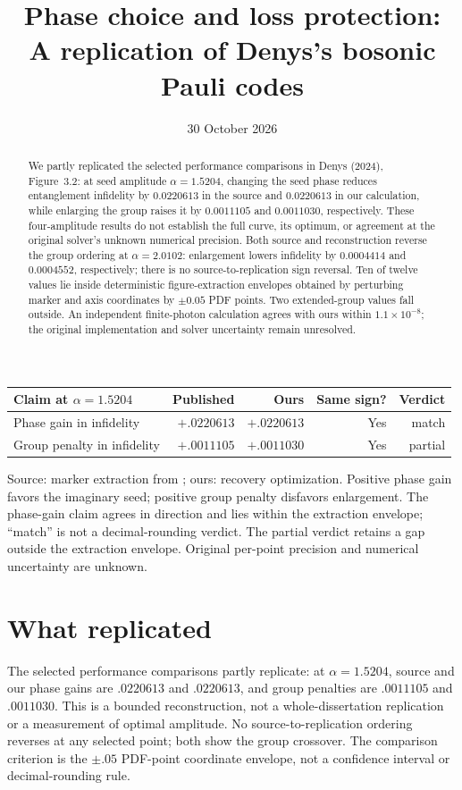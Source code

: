 \documentclass[11pt]{article}
\title{Phase choice and loss protection:\\A replication of Denys's bosonic Pauli codes}
\date{30 October 2026}
\begin{document}
\maketitle
\begin{abstract}
We partly replicated the selected performance comparisons in Denys (2024), Figure~3.2: at seed amplitude $\alpha=1.5204$, changing the seed phase reduces entanglement infidelity by $0.0220613$ in the source and $0.0220613$ in our calculation, while enlarging the group raises it by $0.0011105$ and $0.0011030$, respectively. These four-amplitude results do not establish the full curve, its optimum, or agreement at the original solver's unknown numerical precision. Both source and reconstruction reverse the group ordering at $\alpha=2.0102$: enlargement lowers infidelity by $0.0004414$ and $0.0004552$, respectively; there is no source-to-replication sign reversal. Ten of twelve values lie inside deterministic figure-extraction envelopes obtained by perturbing marker and axis coordinates by $\pm0.05$ PDF points. Two extended-group values fall outside. An independent finite-photon calculation agrees with ours within $1.1\times10^{-8}$; the original implementation and solver uncertainty remain unresolved.
\end{abstract}
\begin{center}\small
\begin{tabular}{p{.27\linewidth}rrrr}
\toprule Claim at $\alpha=1.5204$ & Published & Ours & Same sign? & Verdict\\\midrule
Phase gain in infidelity & $+.0220613$ & $+.0220613$ & Yes & match\\
Group penalty in infidelity & $+.0011105$ & $+.0011030$ & Yes & partial\\
\bottomrule\end{tabular}\end{center}
{\small Source: marker extraction from \citet[p.~150, Fig.~3.2]{denys}; ours: recovery optimization. Positive phase gain favors the imaginary seed; positive group penalty disfavors enlargement. The phase-gain claim agrees in direction and lies within the extraction envelope; ``match'' is not a decimal-rounding verdict. The partial verdict retains a gap outside the extraction envelope. Original per-point precision and numerical uncertainty are unknown.}

\section{What replicated}
The selected performance comparisons partly replicate: at $\alpha=1.5204$, source and our phase gains are $.0220613$ and $.0220613$, and group penalties are $.0011105$ and $.0011030$. This is a bounded reconstruction, not a whole-dissertation replication or a measurement of optimal amplitude. No source-to-replication ordering reverses at any selected point; both show the group crossover. The comparison criterion is the $\pm.05$ PDF-point coordinate envelope, not a confidence interval or decimal-rounding rule.
\end{document}
